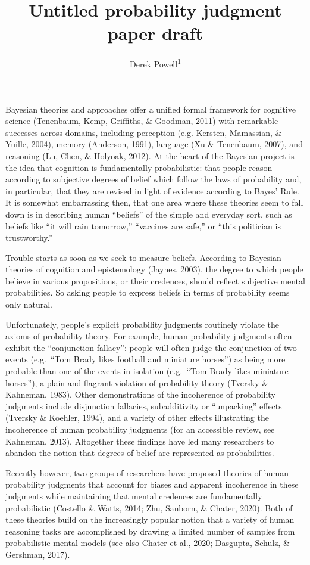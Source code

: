 \documentclass[
  english,
  man,floatsintext]{apa6}
\title{Untitled probability judgment paper draft}
\author{Derek Powell\textsuperscript{1}}
\date{}
\affiliation{\vspace{0.5cm}\textsuperscript{1} Arizona State University, School of Social and Behavioral Sciences}
\begin{document}
\maketitle

Bayesian theories and approaches offer a unified formal framework for cognitive science (Tenenbaum, Kemp, Griffiths, \& Goodman, 2011) with remarkable successes across domains, including perception (e.g. Kersten, Mamassian, \& Yuille, 2004), memory (Anderson, 1991), language (Xu \& Tenenbaum, 2007), and reasoning (Lu, Chen, \& Holyoak, 2012). At the heart of the Bayesian project is the idea that cognition is fundamentally probabilistic: that people reason according to subjective degrees of belief which follow the laws of probability and, in particular, that they are revised in light of evidence according to Bayes' Rule. It is somewhat embarrassing then, that one area where these theories seem to fall down is in describing human ``beliefs'' of the simple and everyday sort, such as beliefs like ``it will rain tomorrow,'' ``vaccines are safe,'' or ``this politician is trustworthy.''

Trouble starts as soon as we seek to measure beliefs. According to Bayesian theories of cognition and epistemology (Jaynes, 2003), the degree to which people believe in various propositions, or their credences, should reflect subjective mental probabilities. So asking people to express beliefs in terms of probability seems only natural.

Unfortunately, people's explicit probability judgments routinely violate the axioms of probability theory. For example, human probability judgments often exhibit the ``conjunction fallacy'': people will often judge the conjunction of two events (e.g.~``Tom Brady likes football and miniature horses'') as being more probable than one of the events in isolation (e.g.~``Tom Brady likes miniature horses''), a plain and flagrant violation of probability theory (Tversky \& Kahneman, 1983). Other demonstrations of the incoherence of probability judgments include disjunction fallacies, subadditivity or ``unpacking'' effects (Tversky \& Koehler, 1994), and a variety of other effects illustrating the incoherence of human probability judgments (for an accessible review, see Kahneman, 2013). Altogether these findings have led many researchers to abandon the notion that degrees of belief are represented as probabilities.

Recently however, two groups of researchers have proposed theories of human probability judgments that account for biases and apparent incoherence in these judgments while maintaining that mental credences are fundamentally probabilistic (Costello \& Watts, 2014; Zhu, Sanborn, \& Chater, 2020). Both of these theories build on the increasingly popular notion that a variety of human reasoning tasks are accomplished by drawing a limited number of samples from probabilistic mental models (see also Chater et al., 2020; Dasgupta, Schulz, \& Gershman, 2017).
\end{document}
